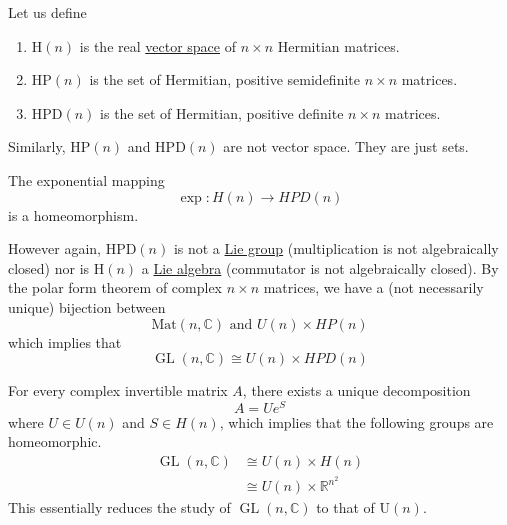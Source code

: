\documentclass{article}
\DeclareMathOperator{\GL}{GL}
\newcounter{theorem}[section]
\newcounter{definition}[section]
\begin{document}
    \begin{definition}
      \label{def:hermitian-and-positive-definite-matrix-spaces}
      Let us define
      \begin{enumerate}
        \item H$(n)$ is the real \hyperref[lin-def:vector-space]{vector space} of $n \times n$ Hermitian matrices. 
        \item HP$(n)$ is the set of Hermitian, positive semidefinite $n \times n$ matrices. 
        \item HPD$(n)$ is the set of Hermitian, positive definite $n \times n$ matrices. 
      \end{enumerate}
      Similarly, HP$(n)$ and HPD$(n)$ are not vector space. They are just sets. 
    \end{definition}

    \begin{lemma}
      \label{thm:exphntohpdn-is-a-homeomorphism}
      The exponential mapping
      \begin{equation}
        \exp: H(n) \rightarrow HPD(n)
      \end{equation}
      is a homeomorphism. 
    \end{lemma}

    However again, HPD$(n)$ is not a \hyperref[def:lie-group]{Lie group} (multiplication is not algebraically closed) nor is H$(n)$ a \hyperref[def:lie-algebra]{Lie algebra} (commutator is not algebraically closed). By the polar form theorem of complex $n \times n$ matrices, we have a (not necessarily unique) bijection between
    \begin{equation}
      \text{Mat}(n, \mathbb{C}) \text{ and } U(n) \times HP(n)
    \end{equation}
    which implies that
    \begin{equation}
      \GL(n, \mathbb{C}) \cong U(n) \times HPD (n)
    \end{equation}

    \begin{corollary}
      \label{thm:complex-polar-decomposition}
      For every complex invertible matrix $A$, there exists a unique decomposition
      \begin{equation}
        A = U e^S
      \end{equation}
      where $U \in U(n)$ and $S \in H(n)$, which implies that the following groups are homeomorphic. 
      \begin{align*}
        \GL(n, \mathbb{C}) & \cong U(n) \times H(n) \\
        & \cong U(n) \times \mathbb{R}^{n^2}
      \end{align*} 
      This essentially reduces the study of $\GL(n, \mathbb{C})$ to that of U$(n)$. 
    \end{corollary}
\end{document}
